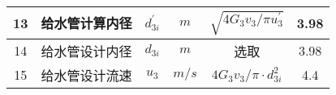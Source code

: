 \begin{table}[H]
{\begin{tabular}{|c|c|c|c|c|c|}
            13   & 给水管计算内径 & $ d_{3i}^{'} $     & $ m $      & $ \sqrt{4 G_{3} v_{3} / \pi u_{3}^{\prime}} $        & 3.98             \\ \hline
            14   & 给水管设计内径 & $ d_{3i} $         & $ m $      & 选取                                                 & 3.98             \\ \hline
            15   & 给水管设计流速 & $ u_3 $            & $ m/s $    & $ 4 G_{3} v_{3} / \pi \cdot d_{3 i}^{2} $            & 4.4              \\ \hline
        \end{tabular}
    }
\end{table}